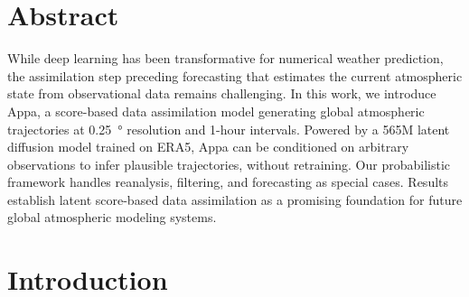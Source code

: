 \section*{Abstract}

While deep learning has been transformative for numerical weather prediction, the assimilation step preceding forecasting that estimates the current atmospheric state from observational data remains challenging. In this work, we introduce Appa, a score-based data assimilation model generating global atmospheric trajectories at \qty{0.25}{\degree} resolution and 1-hour intervals. Powered by a 565M latent diffusion model trained on ERA5, Appa can be conditioned on arbitrary observations to infer plausible trajectories, without retraining. Our probabilistic framework handles reanalysis, filtering, and forecasting as special cases. Results establish latent score-based data assimilation as a promising foundation for future global atmospheric modeling systems.

\section{Introduction} \label{sec:appa-introduction}


